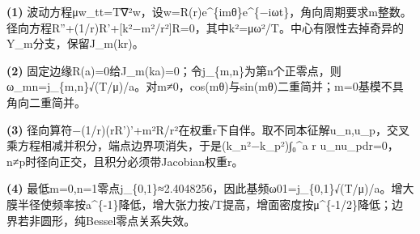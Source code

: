 \par\noindent\textbf{(1)} 波动方程μw\_tt=T∇²w，设w=R(r)e\textasciicircum{}\{imθ\}e\textasciicircum{}\{−iωt\}，角向周期要求m整数。径向方程R''+(1/r)R'+[k²−m²/r²]R=0，其中k²=μω²/T。中心有限性去掉奇异的Y\_m分支，保留J\_m(kr)。
\par\noindent\textbf{(2)} 固定边缘R(a)=0给J\_m(ka)=0；令j\_\{m,n\}为第n个正零点，则ω\_mn=j\_\{m,n\}√(T/μ)/a。对m≠0，cos(mθ)与sin(mθ)二重简并；m=0基模不具角向二重简并。
\par\noindent\textbf{(3)} 径向算符−(1/r)(rR')'+m²R/r²在权重r下自伴。取不同本征解u\_n,u\_p，交叉乘方程相减并积分，端点边界项消失，于是(k\_n²−k\_p²)∫₀\textasciicircum{}a r u\_nu\_pdr=0，n≠p时径向正交，且积分必须带Jacobian权重r。
\par\noindent\textbf{(4)} 最低m=0,n=1零点j\_\{0,1\}≈2.4048256，因此基频ω01=j\_\{0,1\}√(T/μ)/a。增大膜半径使频率按a\textasciicircum{}\{-1\}降低，增大张力按√T提高，增面密度按μ\textasciicircum{}\{-1/2\}降低；边界若非圆形，纯Bessel零点关系失效。

